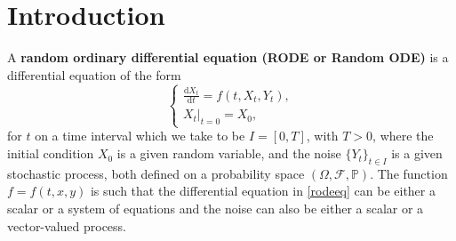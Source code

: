 \documentclass[reqno,12pt]{amsart}
\theoremstyle{plain} %
\theoremstyle{definition} %
\begin{document}
\begin{abstract}
    It is well known that the Euler method for a random ordinary differential equation $\mathrm{d}X_t/\mathrm{d}t = f(t, X_t, Y_t)$ driven by a stochastic process {$\{Y_t\}_{t\in I}$, on a time interval $I,$} with $\theta$-H\"older sample paths {is of strong order} $\theta$ with respect to the time step, provided $f=f(t, x, y)$ is sufficiently regular and with suitable bounds. This order is known to increase to $1$ in some special cases. Here, it is proved that, in many more typical cases, further structures on the noise can be exploited so that the strong convergence is of order 1. In fact, we prove so for any semi-martingale noise. This includes It\^o diffusion processes, point-process noises, transport-type processes with sample paths of bounded variation, and time-changed Brownian motion. The result follows from estimating the global error as an iterated integral over both large and small mesh scales, and by switching the order of integration to move the critical regularity to the large scale. The work is complemented with numerical simulations showing the optimality of the strong order 1 convergence in those cases, and with an example with fractional Brownian motion noise with Hurst parameter $0 < H < 1/2,$ which is not a semi-martingale and for which the order of convergence is $H + 1/2$, hence lower than the attained order 1 in the semi-martingale case, but still higher than the order $H$ of convergence expected from previous works.
\end{abstract}

\maketitle

\tableofcontents

\section{Introduction}
\label{secintro}

A \textbf{random ordinary differential equation (RODE or Random ODE)} is a differential equation of the form
\begin{equation}
  \label{rodeeq}
  \begin{cases}
    \displaystyle \frac{\mathrm{d}X_t}{\mathrm{d} t} = f(t, X_t, Y_t), \\
    \left. X_t \right|_{t = 0} = X_0,
  \end{cases}
\end{equation}
for $t$ on a time interval which we take to be $I=[0, T]$, with $T > 0$, where the initial condition $X_0$ is a given random variable, and the noise $\{Y_t\}_{t\in I}$ is a given stochastic process, both defined on a probability space $(\Omega, \mathcal{F}, \mathbb{P}).$ The function $f=f(t, x, y)$ is such that the differential equation in \cref{rodeeq} can be either a scalar or a system of equations and the noise can also be either a scalar or a vector-valued process.
\end{document}
